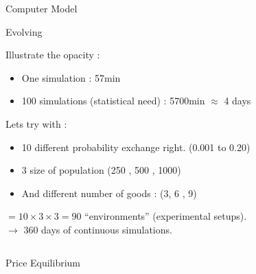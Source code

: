 \documentclass[final]{beamer}
\begin{document}
\begin{frame}
\begin{columns}
\begin{block}{Computer Model}
\begin{block}{Evolving}
		\end{block}



		Illustrate the opacity :
		\begin{itemize}
			\item 	\alert{One simulation : 57min}
			\item	100 simulations (statistical need) : 5700min $\approx$ 4 days
		\end{itemize}

		Lets try with :
		\begin{itemize}
			\item 	10 different probability exchange right. (0.001 to 0.20)
			\item 	3 size of population (250 , 500 , 1000)
			\item 	And different number of goods : (3, 6 , 9)
		\end{itemize}

		\begin{center}
			$= 10 \times 3 \times 3 = 90 $ ``environments'' (experimental setups).\\
			\vfill
			$\rightarrow$ \alert{360 days of continuous simulations.}


		\end{center}



	\end{block}
	\end{columns}


	\begin{columns}
		\begin{block}{Price Equilibrium}


\end{block}
\end{columns}
\end{frame}
\end{document}

